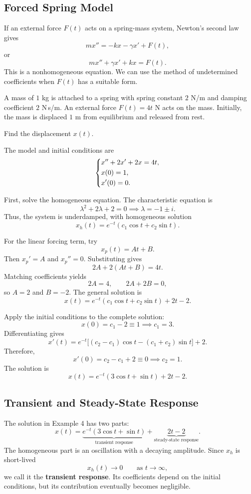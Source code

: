 \documentclass[10pt,letterpaper]{article}
\begin{document}
\subsection{Forced Spring Model}

If an external force $F(t)$ acts on a spring-mass system,
Newton's second law gives
\[
mx''=-kx-\gamma x'+F(t),
\]
or
\[
\boxed{mx''+\gamma x'+kx=F(t).}
\]
This is a nonhomogeneous equation. We can use the method
of undetermined coefficients when $F(t)$ has a suitable form.

\begin{example}[4]{
A mass of $1$ kg is attached to a spring with spring constant
$2$ N/m and damping coefficient $2$ N\,s/m. An external
force $F(t)=4t$ N acts on the mass. Initially, the mass is
displaced $1$ m from equilibrium and released from rest.

Find the displacement $x(t)$.
}
The model and initial conditions are
\[
\begin{dcases}
x''+2x'+2x=4t,\\
x(0)=1,\\
x'(0)=0.
\end{dcases}
\]

First, solve the homogeneous equation. The characteristic
equation is
\[
\lambda^2+2\lambda+2=0
\implies \lambda=-1\pm i.
\]
Thus, the system is underdamped, with homogeneous solution
\[
x_h(t)=e^{-t}(c_1\cos t+c_2\sin t).
\]

For the linear forcing term, try
\[
x_p(t)=At+B.
\]
Then $x_p'=A$ and $x_p''=0$. Substituting gives
\[
2A+2(At+B)=4t.
\]
Matching coefficients yields
\[
2A=4,\qquad 2A+2B=0,
\]
so $A=2$ and $B=-2$. The general solution is
\[
x(t)=e^{-t}(c_1\cos t+c_2\sin t)+2t-2.
\]

Apply the initial conditions to the complete solution:
\[
x(0)=c_1-2\equiv1
\implies c_1=3.
\]
Differentiating gives
\[
x'(t)=e^{-t}
\bigl[(c_2-c_1)\cos t-(c_1+c_2)\sin t\bigr]+2.
\]
Therefore,
\[
x'(0)=c_2-c_1+2\equiv0
\implies c_2=1.
\]
The solution is
\[
\boxed{x(t)=e^{-t}(3\cos t+\sin t)+2t-2.}
\]
\end{example}

\subsection{Transient and Steady-State Response}

The solution in Example 4 has two parts:
\[
x(t)=
\underbrace{e^{-t}(3\cos t+\sin t)}_{\text{transient response}}
+
\underbrace{2t-2}_{\text{steady-state response}}.
\]
The homogeneous part is an oscillation with a decaying
amplitude. Since $x_h$ is short-lived
\[
x_h(t)\to0
\qquad\text{as }t\to\infty,
\]
we call it the \textbf{transient response}. Its coefficients
depend on the initial conditions, but its contribution
eventually becomes negligible.
\end{document}
